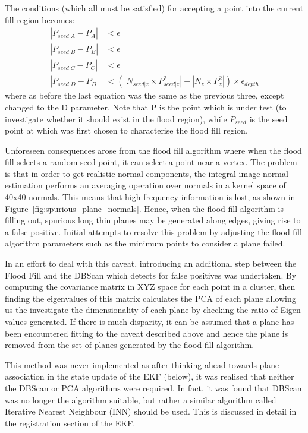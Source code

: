 \documentclass[]{article}
\begin{document}
{The conditions (which all must be satisfied) for accepting a point into the current fill region becomes:
\begin{align}
|P_{seed|A} - P_{A}| &< \epsilon \\
|P_{seed|B} - P_{B}| &< \epsilon\\
|P_{seed|C} - P_{C}| &< \epsilon\\
|P_{seed|D}-P_{D}| &< (|N_{seed|z} \times P^{2}_{seed|z}| + |N_{z} \times P^{2}_{z}|) \times \epsilon_{depth}
\end{align}
where as before the last equation was the same as the previous three, except changed to the D parameter.
Note that P is the point which is under test (to investigate whether it should exist in the flood region), while $P_{seed}$ is the seed point at which was first chosen to characterise the flood fill region. 

Unforeseen consequences arose from the flood fill algorithm where when the flood fill selects a random seed point, it can select a point near a vertex. The problem is that in order to get realistic normal components, the integral image normal estimation performs an averaging operation over normals in a kernel space of 40x40 normals. This means that high frequency information is lost, as shown in Figure~\ref{fig:spurious_plane_normals}. Hence, when the flood fill algorithm is filling out, spurious long thin planes may be generated along edges, giving rise to a false positive. Initial attempts to resolve this problem by adjusting the flood fill algorithm parameters such as the minimum points to consider a plane failed.

In an effort to deal with this caveat, introducing an additional step between the Flood Fill and the DBScan which detects for false positives was undertaken. By computing the covariance matrix in XYZ space for each point in a cluster, then finding the eigenvalues of this matrix calculates the PCA of each plane allowing us the investigate the dimensionality of each plane by checking the ratio of Eigen values generated. If there is much disparity, it can be assumed that a plane has been encountered fitting to the caveat described above and hence the plane is removed from the set of planes generated by the flood fill algorithm. 

This method was never implemented as after thinking ahead towards plane association in the state update of the EKF (below), it was realised that neither the DBScan or PCA algorithms were required.  In fact, it was found that DBScan was no longer the algorithm suitable, but rather a similar algorithm called Iterative Nearest Neighbour (INN) should be used. This is discussed in detail in the registration section of the EKF.


}
\end{document}
